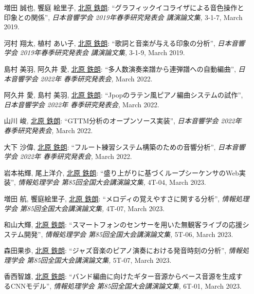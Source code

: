 \begin{Enumerate}
\item 
増田 誠也, 
饗庭 絵里子, 
\underline{北原 鉄朗}: 
    ``グラフィックイコライザによる音色操作と印象との関係'', 
    {\it 日本音響学会 2019年春季研究発表会 講演論文集,
    } 3-1-7, March 2019. 

\item 
河村 翔太, 
植村 あい子, 
\underline{北原 鉄朗}: 
    ``歌詞と音楽が与える印象の分析'', 
    {\it 日本音響学会 2019年春季研究発表会 講演論文集,
    } 3-1-9, March 2019. 

\item 
島村 美羽, 
阿久井 愛, 
\underline{北原 鉄朗}: 
    ``多人数演奏楽譜から連弾譜への自動編曲'', 
    {\it 日本音響学会 2022年 春季研究発表会,
    } March 2022. 

\item 
阿久井 愛, 
島村 美羽, 
\underline{北原 鉄朗}: 
    ``Jpopのラテン風ピアノ編曲システムの試作'', 
    {\it 日本音響学会 2022年 春季研究発表会,
    } March 2022. 

\item 
山川 峻, 
\underline{北原 鉄朗}: 
    ``GTTM分析のオープンソース実装'', 
    {\it 日本音響学会 2022年 春季研究発表会,
    } March 2022. 

\item 
大下 沙偉, 
\underline{北原 鉄朗}: 
    ``フルート練習システム構築のための音響分析'', 
    {\it 日本音響学会 2022年 春季研究発表会,
    } March 2022. 

\item 
岩本祐輝, 
尾上洋介, 
\underline{北原 鉄朗}: 
    ``盛り上がりに基づくループシーケンサのWeb実装'', 
    {\it 情報処理学会 第85回全国大会講演論文集,
    } 4T-04, March 2023. 

\item 
増田 航, 
饗庭絵里子, 
\underline{北原 鉄朗}: 
    ``メロディの覚えやすさに関する分析'', 
    {\it 情報処理学会 第85回全国大会講演論文集,
    } 4T-07, March 2023. 

\item 
和山大輝, 
\underline{北原 鉄朗}: 
    ``スマートフォンのセンサーを用いた無観客ライブの応援システム開発'', 
    {\it 情報処理学会 第85回全国大会講演論文集,
    } 5T-06, March 2023. 

\item 
森田果歩, 
\underline{北原 鉄朗}: 
    ``ジャズ音楽のピアノ演奏における発音時刻の分析'', 
    {\it 情報処理学会 第85回全国大会講演論文集,
    } 5T-07, March 2023. 

\item 
香西智雄, 
\underline{北原 鉄朗}: 
    ``バンド編曲に向けたギター音源からベース音源を生成するCNNモデル'', 
    {\it 情報処理学会 第85回全国大会講演論文集,
    } 6T-01, March 2023. 


\end{Enumerate}
